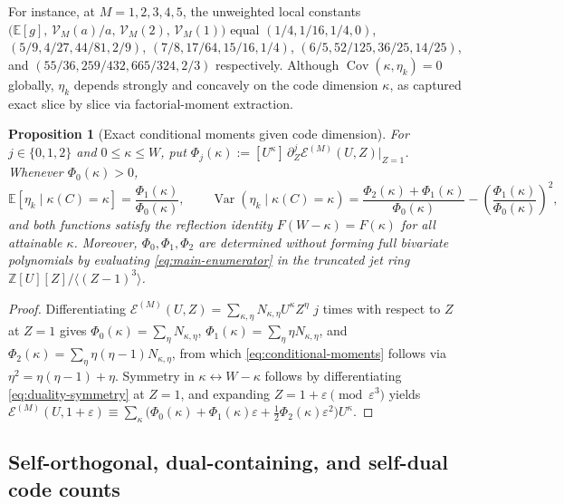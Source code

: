\documentclass[preprint,12pt]{elsarticle}
\newcommand{\Z}{\mathbb Z}
\newcommand{\Epoly}{\mathscr E}
\newcommand{\Var}{\operatorname{Var}}
\newcommand{\Cov}{\operatorname{Cov}}
\numberwithin{equation}{section}
\theoremstyle{plain}
\newtheorem{proposition}[theorem]{Proposition}
\theoremstyle{definition}
\theoremstyle{remark}
\begin{document}
For instance, at $M=1,2,3,4,5$, the unweighted local constants
$\bigl(\mathbb E[g],\,\mathcal V_M(a)/a,\,\mathcal V_M(2),\,\mathcal V_M(1)\bigr)$
equal $(1/4,1/16,1/4,0)$, $(5/9,4/27,44/81,2/9)$, $(7/8,17/64,15/16,1/4)$,
$(6/5,52/125,36/25,14/25)$, and $(55/36,259/432,665/324,2/3)$ respectively.
Although $\Cov(\kappa,\eta_k)=0$ globally, $\eta_k$ depends strongly and
concavely on the code dimension $\kappa$, as captured exact slice by slice via
factorial-moment extraction.

\begin{proposition}[Exact conditional moments given code dimension]\label{prop:conditional}
For $j\in\{0,1,2\}$ and $0\le\kappa\le W$, put
$\Phi_j(\kappa):=[U^\kappa]\,\partial_Z^j\Epoly^{(M)}(U,Z)\big|_{Z=1}$. Whenever
$\Phi_0(\kappa)>0$,
\begin{equation}\label{eq:conditional-moments}
\mathbb E[\eta_k\mid\kappa(C)=\kappa]=\frac{\Phi_1(\kappa)}{\Phi_0(\kappa)},
\qquad
\Var(\eta_k\mid\kappa(C)=\kappa)
 =\frac{\Phi_2(\kappa)+\Phi_1(\kappa)}{\Phi_0(\kappa)}
  -\left(\frac{\Phi_1(\kappa)}{\Phi_0(\kappa)}\right)^2,
\end{equation}
and both functions satisfy the reflection identity
$F(W-\kappa)=F(\kappa)$ for all attainable $\kappa$. Moreover, $\Phi_0,\Phi_1,\Phi_2$
are determined without forming full bivariate polynomials by evaluating
\eqref{eq:main-enumerator} in the truncated jet ring
$\Z[U][Z]/\langle(Z-1)^3\rangle$.
\end{proposition}

\begin{proof}
Differentiating $\Epoly^{(M)}(U,Z)=\sum_{\kappa,\eta}N_{\kappa,\eta}U^\kappa Z^\eta$
$j$ times with respect to $Z$ at $Z=1$ gives $\Phi_0(\kappa)=\sum_\eta N_{\kappa,\eta}$,
$\Phi_1(\kappa)=\sum_\eta\eta N_{\kappa,\eta}$, and
$\Phi_2(\kappa)=\sum_\eta\eta(\eta-1)N_{\kappa,\eta}$, from which
\eqref{eq:conditional-moments} follows via $\eta^2=\eta(\eta-1)+\eta$. Symmetry in
$\kappa\leftrightarrow W-\kappa$ follows by differentiating \eqref{eq:duality-symmetry}
at $Z=1$, and expanding $Z=1+\varepsilon\pmod{\varepsilon^3}$ yields
$\Epoly^{(M)}(U,1+\varepsilon)\equiv\sum_\kappa\bigl(\Phi_0(\kappa)
+\Phi_1(\kappa)\varepsilon+\frac{1}{2}\Phi_2(\kappa)\varepsilon^2\bigr)U^\kappa$.
\end{proof}

\subsection{Self-orthogonal, dual-containing, and self-dual code counts}\label{sec:extremal}
\end{document}
